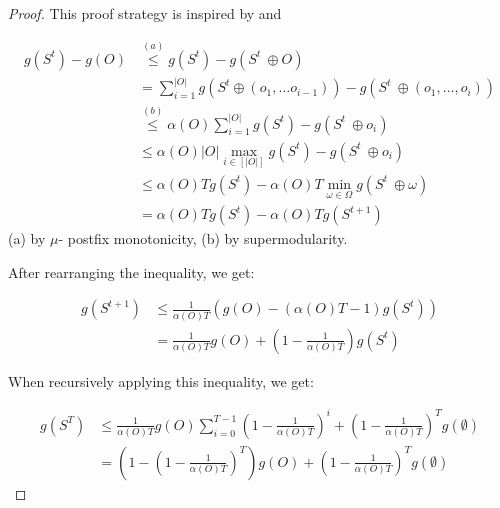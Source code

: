\documentclass{article} %
\begin{document}
\begin{proof}

This proof strategy is inspired by \citet{streeter2008online} and \citet{liberty2017greedy}

\begin{align*}
    g(S^t) -g(O) &\overset{(a)}{\leq} g(S^t) - g(S^t\ \oplus O) \\
    &=\sum_{i = 1}^{|O|} g(S^t \oplus \left(o_1, \dots o_{i - 1}\right)) -g(S^t\ \oplus \left(o_1, \dots, o_{i}\right))\\
    &\overset{(b)}{\leq}  \alpha(O)\sum_{i = 1}^{|O|} g(S^t) -g(S^t\ \oplus  o_{i}) \\
    &\leq \alpha(O)|O|\max_{i \in [|O|]} g(S^t) -g(S^t\ \oplus  o_{i}) \\
    &\leq \alpha(O) T g(S^t) -  \alpha(O) T\min_{\omega \in \Omega} g(S^t\ \oplus  \omega) \\
    &= \alpha(O) Tg(S^t) -  \alpha(O) Tg(S^{t + 1})
\end{align*}
(a) by $\mu$- postfix monotonicity, (b) by supermodularity. 

After rearranging the inequality, we get:

\begin{align*}
    g(S^{t + 1}) &\leq \frac{1}{\alpha(O) T}\left(g(O) -  \left(\alpha(O) T - 1\right)g(S^t)\right) \\
    &= \frac{1}{\alpha(O) T}g(O) + \left(1 - \frac{1}{\alpha(O) T}\right)g(S^t)
\end{align*}

When recursively applying this inequality, we get:

\begin{align*}
     g(S^{T}) &\leq \frac{1}{\alpha(O) T}g(O)\sum_{i = 0}^{T - 1}\left(1 - \frac{1}{\alpha(O) T}\right)^i + \left(1 - \frac{1}{\alpha(O) T}\right)^Tg(\emptyset) \\
     &= \left(1 - \left(1 - \frac{1}{\alpha(O) T}\right)^T\right)g(O) + \left(1 - \frac{1}{\alpha(O) T}\right)^Tg(\emptyset)
\end{align*}


\end{proof}
\end{document}
